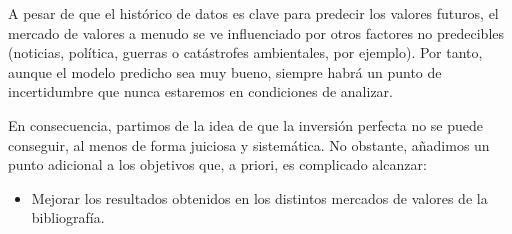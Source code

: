 	A pesar de que el hist\'orico de datos es clave para predecir los valores futuros, el mercado de valores a menudo se ve influenciado por otros factores no predecibles (noticias, pol\'itica, guerras o cat\'astrofes ambientales, por ejemplo). Por tanto, aunque el modelo predicho sea muy bueno, siempre habr\'a un punto de incertidumbre que nunca estaremos en condiciones de analizar.
	
	En consecuencia, partimos de la idea de que la inversi\'on perfecta no se puede conseguir, al menos de forma juiciosa y sistem\'atica. No obstante, a\~nadimos un punto adicional a los objetivos que, a priori, es complicado alcanzar:
	
	\begin{itemize}
	    \item Mejorar los resultados obtenidos en los distintos mercados de valores de la bibliograf\'ia.
	\end{itemize}
	
	
